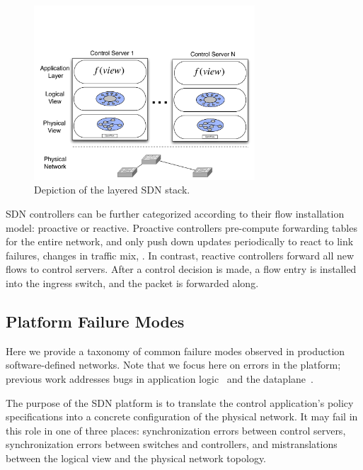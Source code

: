 \begin{figure}[t]
    \includegraphics[width=3.25in]{../diagrams/architecture/SDN_Stack.pdf}
    \caption[]{\label{fig:basicarch} Depiction of the layered SDN stack.} 
\end{figure}

SDN controllers can be further categorized according to their flow
installation model: proactive or reactive.
Proactive controllers pre-compute forwarding tables for the entire network,
and only push down updates periodically to react to link failures, changes in
traffic mix, \etc. In contrast, reactive controllers forward all new flows to
control servers. After a control decision is made, a flow entry is installed
into the ingress switch, and the packet is forwarded along.

\subsection{Platform Failure Modes}

Here we provide a taxonomy of common failure modes observed in
production software-defined networks. Note that we focus here on errors in the
platform; previous work addresses bugs in application
logic~\cite{nice} and the dataplane~\cite{anteater,hsa}.

The purpose of the SDN platform is to translate the control application's policy
specifications into a concrete configuration of the physical network. It may
fail in this role in one of three places: synchronization errors between control
servers, synchronization errors between switches and controllers, and
mistranslations between the logical view and the physical network topology.


